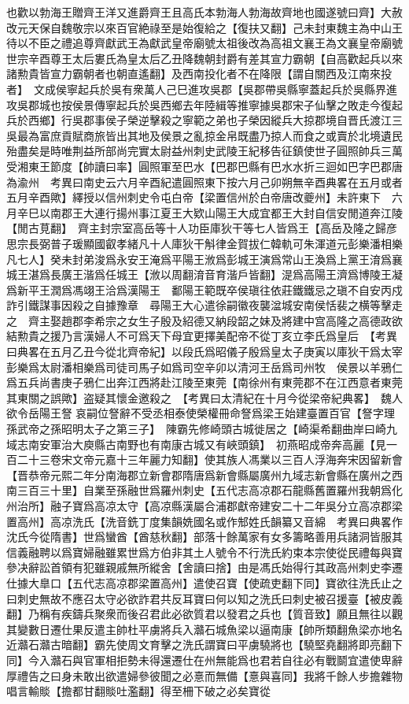 也歡以勃海王贈齊王洋又進爵齊王且高氏本勃海人勃海故齊地也國遂號曰齊】大赦改元天保自魏敬宗以來百官絶祿至是始復給之【復扶又翻】己未封東魏主為中山王待以不臣之禮追尊齊獻武王為獻武皇帝廟號太祖後改為高祖文襄王為文襄皇帝廟號世宗辛酉尊王太后婁氏為皇太后乙丑降魏朝封爵有差其宣力霸朝【自高歡起兵以來諸勲貴皆宣力霸朝者也朝直遙翻】及西南投化者不在降限【謂自關西及江南來投者】　文成侯寧起兵於吳有衆萬人己巳進攻吳郡【吳郡帶吳縣寧蓋起兵於吳縣界進攻吳郡城也按侯景傳寧起兵於吳西鄉去年陸緝等推寧據吳郡宋子仙擊之敗走今復起兵於西鄉】行吳郡事侯子榮逆擊殺之寧範之弟也子榮因縱兵大掠郡境自晋氏渡江三吳最為富庶貢賦商旅皆出其地及侯景之亂掠金帛既盡乃掠人而食之或賣於北境遺民殆盡矣是時唯荆益所部尚完實太尉益州刺史武陵王紀移告征鎮使世子圓照帥兵三萬受湘東王節度【帥讀曰率】圓照軍至巴水【巴郡巴縣有巴水水折三迴如巴字巴郡唐為渝州　考異曰南史云六月辛酉紀遣圓照東下按六月己卯朔無辛酉典畧在五月或者五月辛酉歟】繹授以信州刺史令屯白帝【梁置信州於白帝唐改夔州】未許東下　六月辛巳以南郡王大連行揚州事江夏王大欵山陽王大成宜都王大封自信安閒道奔江陵【閒古莧翻】　齊主封宗室高岳等十人功臣庫狄干等七人皆爲王【高岳及隆之歸彦思宗長弼普子瑗顯國叡孝緒凡十人庫狄干斛律金賀拔仁韓軌可朱渾道元彭樂潘相樂凡七人】癸未封弟浚爲永安王淹爲平陽王浟爲彭城王演爲常山王渙爲上黨王淯爲襄城王湛爲長廣王湝爲任城王【浟以周翻淯音育湝戶皆翻】湜爲高陽王濟爲博陵王凝爲新平王潤爲馮翊王洽爲漢陽王　鄱陽王範既卒侯瑱往依莊鐵鐵忌之瑱不自安丙戍詐引鐵謀事因殺之自據豫章　尋陽王大心遣徐嗣徽夜襲湓城安南侯恬裴之横等擊走之　齊主娶趙郡李希宗之女生子殷及紹德又納段韶之妹及將建中宫高隆之高德政欲結勲貴之援乃言漢婦人不可爲天下母宜更擇美配帝不從丁亥立李氏爲皇后　【考異曰典畧在五月乙丑今從北齊帝紀】以段氏爲昭儀子殷爲皇太子庚寅以庫狄干爲太宰彭樂爲太尉潘相樂爲司徒司馬子如爲司空辛卯以清河王岳爲司州牧　侯景以羊鴉仁爲五兵尚書庚子鴉仁出奔江西將赴江陵至東莞【南徐州有東莞郡不在江西意者東莞其東關之誤歟】盗疑其懷金邀殺之　【考異曰太清紀在十月今從梁帝紀典畧】　魏人欲令岳陽王詧哀嗣位詧辭不受丞相泰使榮權冊命詧爲梁王始建臺置百官【詧字理孫武帝之孫昭明太子之第三子】　陳霸先修崎頭古城徙居之【崎渠希翻曲岸曰崎九域志南安軍治大庾縣古南野也有南康古城又有峽頭鎮】　初燕昭成帝奔高麗【見一百二十三卷宋文帝元嘉十三年麗力知翻】使其族人馮業以三百人浮海奔宋因留新會【晋恭帝元熙二年分南海郡立新會郡隋唐爲新會縣屬廣州九域志新會縣在廣州之西南三百三十里】自業至孫融世爲羅州刺史【五代志高凉郡石龍縣舊置羅州我朝爲化州治所】融子寶爲高凉太守【高凉縣漢屬合浦郡獻帝建安二十二年吳分立高凉郡梁置高州】高凉洗氏【洗音銑丁度集韻姺國名或作䢾姓氏韻纂又音綿　考異曰典畧作沈氏今從隋書】世爲蠻酋【酋慈秋翻】部落十餘萬家有女多籌略善用兵諸洞皆服其信義融聘以爲寶婦融雖累世爲方伯非其土人號令不行洗氏約束本宗使從民禮每與寶參决辭訟首領有犯雖親戚無所縱舍【舍讀曰捨】由是馮氏始得行其政高州刺史李遷仕據大臯口【五代志高凉郡梁置高州】遣使召寶【使疏吏翻下同】寶欲往洗氏止之曰刺史無故不應召太守必欲詐君共反耳寶曰何以知之洗氏曰刺史被召援臺【被皮義翻】乃稱有疾鑄兵聚衆而後召君此必欲質君以發君之兵也【質音致】願且無往以觀其變數日遷仕果反遣主帥杜平虜將兵入灨石城魚梁以逼南康【帥所類翻魚梁亦地名近灨石灨古暗翻】霸先使周文育擊之洗氏謂寶曰平虜驍將也【驍堅堯翻將即亮翻下同】今入灨石與官軍相拒勢未得還遷仕在州無能爲也君若自往必有戰鬬宜遣使卑辭厚禮告之曰身未敢出欲遣婦參彼聞之必憙而無備【憙與喜同】我將千餘人步擔雜物唱言輸賧【擔都甘翻賧吐濫翻】得至柵下破之必矣寶從
